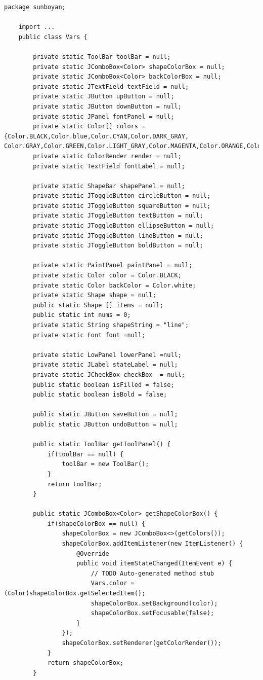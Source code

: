 \documentclass{ctexart}
\begin{document}
\begin{lstlisting}[caption = Vars.Java]
    package sunboyan;

    import ...
    public class Vars {
    
        private static ToolBar toolBar = null;
        private static JComboBox<Color> shapeColorBox = null;
        private static JComboBox<Color> backColorBox = null;
        private static JTextField textField = null;
        private static JButton upButton = null;
        private static JButton downButton = null;
        private static JPanel fontPanel = null;
        private static Color[] colors = {Color.BLACK,Color.blue,Color.CYAN,Color.DARK_GRAY, Color.GRAY,Color.GREEN,Color.LIGHT_GRAY,Color.MAGENTA,Color.ORANGE,Color.RED,Color.WHITE,Color.YELLOW};
        private static ColorRender render = null;
        private static TextField fontLabel = null;
        
        private static ShapeBar shapePanel = null;
        private static JToggleButton circleButton = null;
        private static JToggleButton squareButton = null;
        private static JToggleButton textButton = null;
        private static JToggleButton ellipseButton = null;
        private static JToggleButton lineButton = null;
        private static JToggleButton boldButton = null;
        
        private static PaintPanel paintPanel = null;
        private static Color color = Color.BLACK;
        private static Color backColor = Color.white;
        private static Shape shape = null;
        public static Shape [] items = null;
        public static int nums = 0;
        private static String shapeString = "line";
        private static Font font =null;
        
        private static LowPanel lowerPanel =null;
        private static JLabel stateLabel = null;
        private static JCheckBox checkBox  = null;
        public static boolean isFilled = false;
        public static boolean isBold = false;
        
        public static JButton saveButton = null;
        public static JButton undoButton = null;
        
        public static ToolBar getToolPanel() {
            if(toolBar == null) {
                toolBar = new ToolBar();
            }
            return toolBar;
        }

        public static JComboBox<Color> getShapeColorBox() {
            if(shapeColorBox == null) {
                shapeColorBox = new JComboBox<>(getColors());
                shapeColorBox.addItemListener(new ItemListener() {			
                    @Override
                    public void itemStateChanged(ItemEvent e) {
                        // TODO Auto-generated method stub
                        Vars.color = (Color)shapeColorBox.getSelectedItem();
                        shapeColorBox.setBackground(color);
                        shapeColorBox.setFocusable(false);
                    }
                });
                shapeColorBox.setRenderer(getColorRender());
            }
            return shapeColorBox;
        }


\end{lstlisting}
\end{document}
